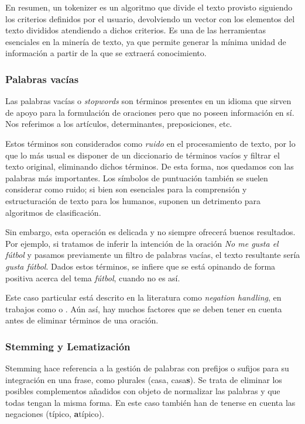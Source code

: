 En resumen, un tokenizer es un algoritmo que divide el texto provisto siguiendo los criterios definidos por el usuario, devolviendo un vector con los elementos del texto divididos atendiendo a dichos criterios. Es una de las herramientas esenciales en la minería de texto, ya que permite generar la mínima unidad de información a partir de la que se extraerá conocimiento.

\subsubsection{Palabras vacías}
\label{sec:stopwords}
Las palabras vacías o \textit{stopwords} son términos presentes en un idioma que sirven de apoyo para la formulación de oraciones pero que no poseen información en sí. Nos referimos a los artículos, determinantes, preposiciones, etc.

Estos términos son considerados como \textit{ruido} en el procesamiento de texto, por lo que lo más usual es disponer de un diccionario de términos vacíos y filtrar el texto original, eliminando dichos términos. De esta forma, nos quedamos con las palabras más importantes. Los símbolos de puntuación también se suelen considerar como ruido; si bien son esenciales para la comprensión y estructuración de texto para los humanos, suponen un detrimento para algoritmos de clasificación.

Sin embargo, esta operación es delicada y no siempre ofrecerá buenos resultados. Por ejemplo, si tratamos de inferir la intención de la oración \textit{No me gusta el fútbol} y pasamos previamente un filtro de palabras vacías, el texto resultante sería \textit{gusta fútbol}. Dados estos términos, se infiere que se está opinando de forma positiva acerca del tema \textit{fútbol}, cuando no es así.

Este caso particular está descrito en la literatura como \textit{negation handling}, en trabajos como \cite{Farooq2017NegationHI} o \cite{Ali2020ConventionalAS}. Aún así, hay muchos factores que se deben tener en cuenta antes de eliminar términos de una oración.



\subsubsection{Stemming y Lematización}
Stemming hace referencia a la gestión de palabras con prefijos o sufijos para su integración en una frase, como plurales (casa, casa\textbf{s}). Se trata de eliminar los posibles complementos añadidos con objeto de normalizar las palabras y que todas tengan la misma forma. En este caso también han de tenerse en cuenta las negaciones (típico, \textbf{a}típico).

